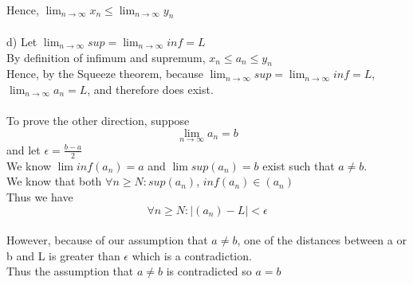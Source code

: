 \documentclass{article}
\begin{document}
\\Hence, $\lim_{n \to \infty} x_n \leq \lim_{n \to \infty} y_n$
\\
\\d) Let $\lim_{n \to \infty} sup = \lim_{n \to \infty} inf = L$
\\By definition of infimum and supremum, $x_n \leq a_n \leq y_n$
\\Hence, by the Squeeze theorem, because $\lim_{n \to \infty} sup = \lim_{n \to \infty} inf = L$, $ \lim_{n \to \infty} a_n = L$, and therefore does exist.
\\
\\To prove the other direction, suppose $$\lim_{n \to \infty} a_n = b$$ and let $\epsilon = \frac{b-a}{2}$
\\We know $\lim inf(a_n) = a$ and $\lim sup(a_n) = b$ exist such that $a \neq b$.
\\We know that both $\forall n \geq N : sup(a_n)$, $inf(a_n) \in (a_n)$
\\Thus we have $$\forall n \geq N : |(a_n) - L| < \epsilon$$
\\However, because of our assumption that $a \neq b$, one of the distances between a or b and L is greater than $\epsilon$ which is a contradiction.
\\Thus the assumption that $a \neq b$ is contradicted so $a = b$
\end{document}
